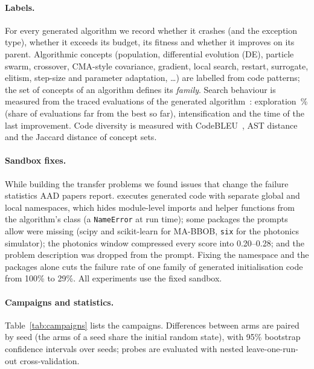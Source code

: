\paragraph{Labels.}
For every generated algorithm we record whether it crashes (and the
exception type), whether it exceeds its budget, its fitness and whether
it improves on its parent. Algorithmic concepts (population, differential
evolution (DE), particle swarm, crossover, CMA-style covariance,
gradient, local search, restart, surrogate, elitism, step-size and
parameter adaptation, \dots) are labelled from code patterns; the set of
concepts of an algorithm defines its \emph{family}. Search behaviour is
measured from the traced evaluations of the generated
algorithm~\cite{blade2025}: exploration~\% (share of evaluations far from
the best so far), intensification and the time of the last improvement.
Code diversity is measured with CodeBLEU~\cite{ren2020codebleu}, AST
distance and the Jaccard distance of concept sets.

\paragraph{Sandbox fixes.}
While building the transfer problems we found issues that change the
failure statistics AAD papers report. \blade executes generated code with
separate global and local namespaces, which hides module-level imports
and helper functions from the algorithm's class (a \texttt{NameError}
at run time); some packages the prompts allow were missing (scipy and
scikit-learn for MA-BBOB, \texttt{six} for the photonics simulator); the
photonics \aocc window compressed every score into 0.20--0.28; and the
problem description was dropped from the \llamea prompt. Fixing the
namespace and the packages alone cuts the failure rate of one family of
generated initialisation code from 100\% to 29\%. All experiments use
the fixed sandbox.

\paragraph{Campaigns and statistics.}
Table~\ref{tab:campaigns} lists the campaigns. Differences between arms
are paired by seed (the arms of a seed share the initial random state),
with 95\% bootstrap confidence intervals over seeds; probes are evaluated
with nested leave-one-run-out cross-validation.

